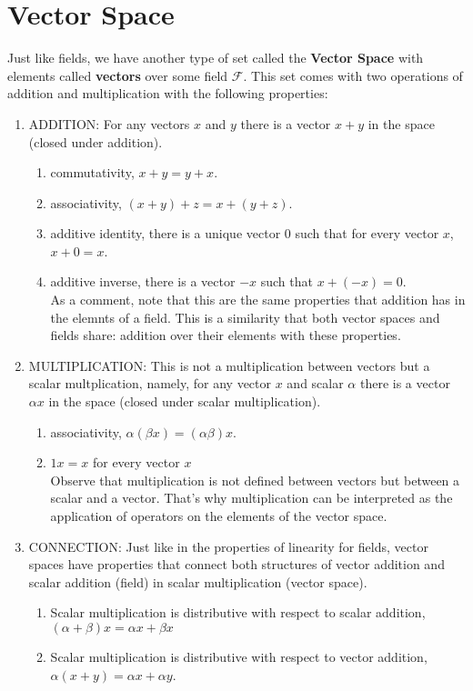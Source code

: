 \documentclass[12pt]{article}
\begin{document}
\section{Vector Space}

Just like fields, we have another type of set called the \textbf{Vector Space} with elements called \textbf{vectors} over some field $\mathcal{F}$. This set comes with two operations of addition and multiplication with the following properties:
\begin{enumerate}
  \item ADDITION: For any vectors $x$ and $y$ there is a vector $x+y$ in the space (closed under addition). 
\begin{enumerate}[label=\arabic*.]
  \item commutativity, $x+y=y+x$.
  \item associativity, $(x+y)+z=x+(y+z)$.
  \item additive identity, there is a unique vector $0$ such that  for every vector $x$, $x+0=x$.
  \item additive inverse, there is a vector $-x$ such that $x+(-x)=0$.\\

    As a comment, note that this are the same properties that addition has in the elemnts of a field. This is a similarity that both vector spaces and fields share: addition over their elements with these properties.\\
\end{enumerate}
\item MULTIPLICATION: This is not a multiplication between vectors but a scalar multplication, namely, for any vector $x$ and scalar $\alpha$ there is a vector $\alpha x$ in the space (closed under scalar multiplication).
  \begin{enumerate}[label=\arabic*.]
    \item associativity, $\alpha(\beta x) = (\alpha\beta)x$.
    \item $1x = x$ for every vector $x$\\

      Observe that multiplication is not defined between vectors but between a scalar and a vector. That's why multiplication can be interpreted as the application of operators on the elements of the vector space.
\end{enumerate}
\item CONNECTION: Just like in the properties of linearity for fields, vector spaces have properties that connect both structures of vector addition and scalar addition (field) in scalar multiplication (vector space).
\begin{enumerate}[label=\arabic*.]
  \item Scalar multiplication is distributive with respect to scalar addition, $(\alpha+\beta)x = \alpha x+ \beta x$
  \item Scalar multiplication is distributive with respect to  vector addition, $\alpha(x+y) = \alpha x + \alpha y$.
\end{enumerate}
\end{enumerate}
\end{document}

